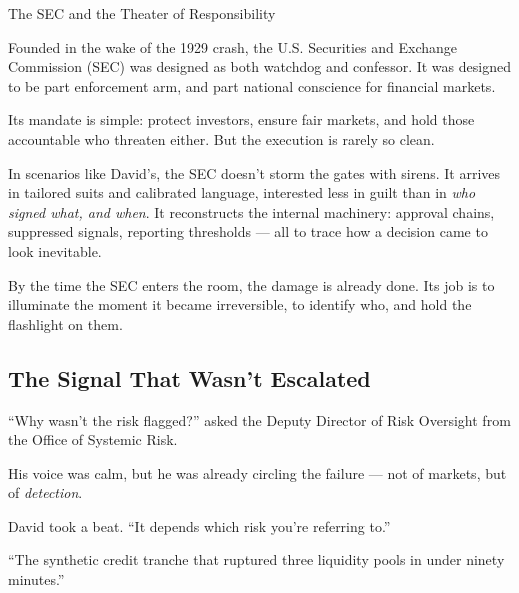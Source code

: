 \begin{HistoricalSidebar}{The SEC and the Theater of Responsibility}

  Founded in the wake of the 1929 crash, the U.S. Securities and Exchange Commission (SEC) was designed as both 
  watchdog and confessor. It was designed to be part enforcement arm, and part national conscience for financial markets.

  \medskip
  
  Its mandate is simple: protect investors, ensure fair markets, and hold those accountable who threaten either. 
  But the execution is rarely so clean.

  \medskip
  
  In scenarios like David’s, the SEC doesn't storm the gates with sirens. It arrives in tailored suits and 
  calibrated language, interested less in guilt than in \textit{who signed what, and when}. It reconstructs the internal 
  machinery: approval chains, suppressed signals, reporting thresholds — all to trace how a decision came to look inevitable.

  \medskip
  
  By the time the SEC enters the room, the damage is already done. Its job is to illuminate the moment it became 
  irreversible, to identify who, and hold the flashlight on them.
  
\end{HistoricalSidebar}

\medskip

\subsection{The Signal That Wasn't Escalated}

``Why wasn’t the risk flagged?'' asked the Deputy Director of Risk Oversight from the Office of 
Systemic Risk.

His voice was calm, but he was already circling the failure — not of markets, but of \textit{detection}.

David took a beat. ``It depends which risk you’re referring to.''

``The synthetic credit tranche that ruptured three liquidity pools in under ninety minutes.''

\medskip

